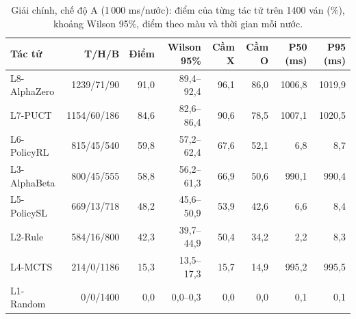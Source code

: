 \begin{table}[H]
  \centering\footnotesize
  \caption{Giải chính, chế độ A (1\,000 ms/nước): điểm của từng tác tử trên 1400 ván (\%), khoảng Wilson 95\%, điểm theo màu và thời gian mỗi nước.}
  \label{tab:giai-a}
  \setlength{\tabcolsep}{4pt}
  \begin{tabular}{@{}lrrrrrrr@{}}
    \toprule
    Tác tử & T/H/B & Điểm & Wilson 95\% & Cầm X & Cầm O & P50 (ms) & P95 (ms) \\
    \midrule
    L8-AlphaZero & 1239/71/90 & 91{,}0 & 89{,}4--92{,}4 & 96{,}1 & 86{,}0 & 1006{,}8 & 1019{,}9 \\
    L7-PUCT & 1154/60/186 & 84{,}6 & 82{,}6--86{,}4 & 90{,}6 & 78{,}5 & 1007{,}1 & 1020{,}5 \\
    L6-PolicyRL & 815/45/540 & 59{,}8 & 57{,}2--62{,}4 & 67{,}6 & 52{,}1 & 6{,}8 & 8{,}7 \\
    L3-AlphaBeta & 800/45/555 & 58{,}8 & 56{,}2--61{,}3 & 66{,}9 & 50{,}6 & 990{,}1 & 990{,}4 \\
    L5-PolicySL & 669/13/718 & 48{,}2 & 45{,}6--50{,}9 & 53{,}9 & 42{,}6 & 6{,}6 & 8{,}4 \\
    L2-Rule & 584/16/800 & 42{,}3 & 39{,}7--44{,}9 & 50{,}4 & 34{,}2 & 2{,}2 & 8{,}3 \\
    L4-MCTS & 214/0/1186 & 15{,}3 & 13{,}5--17{,}3 & 15{,}7 & 14{,}9 & 995{,}2 & 995{,}5 \\
    L1-Random & 0/0/1400 & 0{,}0 & 0{,}0--0{,}3 & 0{,}0 & 0{,}0 & 0{,}1 & 0{,}1 \\
    \bottomrule
  \end{tabular}
\end{table}
